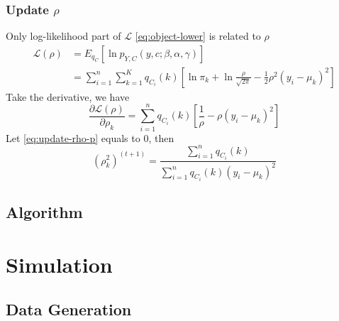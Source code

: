 \documentclass[12pt, a4paper, oneside]{article}
\numberwithin{equation}{section}
\begin{document}
\subsubsection{Update $\rho$}
Only log-likelihood part of $\mathcal{L}$ \ref{eq:object-lower} is related to $\rho$
\begin{equation}
\begin{aligned}
\mathcal{L}(\rho) &= E_{q_C}\left[\ln{p_{Y,C}(y,c;\beta,\alpha,\gamma)}\right] \\
&= \displaystyle\sum_{i=1}^{n}\sum_{k=1}^{K} q_{C_i}(k)\left[\ln \pi_k + \ln\frac{\rho}{\sqrt{2\pi}} - \frac{1}{2}\rho^2(y_i-\mu_k)^2\right]
\end{aligned}
\end{equation}
Take the derivative, we have
\begin{equation}
\label{eq:update-rho-p}
\frac{\partial \mathcal{L}(\rho)}{\partial \rho_{k}} = \displaystyle\sum_{i=1}^{n} q_{C_i}(k)\left[\frac{1}{\rho} - \rho(y_i - \mu_k)^2\right]
\end{equation}
Let \ref{eq:update-rho-p} equals to 0, then
\begin{equation}
\label{eq:update-rho}
(\rho^{2}_{k})^{(t+1)} = \frac{ \displaystyle\sum_{i=1}^{n} q_{C_i}(k)}{ \displaystyle\sum_{i=1}^{n} q_{C_i}(k)(y_i - \mu_k)^2}
\end{equation}

\subsection{Algorithm}

\section{Simulation}
\label{sec:simulation}

\subsection{Data Generation}
\label{subsec:data-generation}
\end{document}
